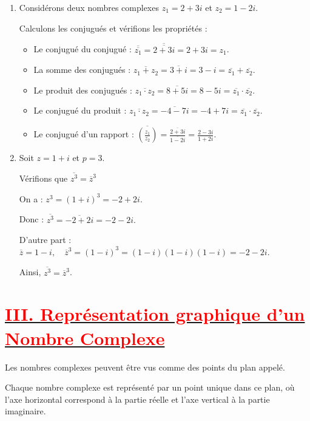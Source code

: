 \documentclass[12pt,a4paper]{article}
\begin{document}
\begin{enumerate}
\item Considérons deux nombres complexes $z_1 = 2 + 3i$ et $z_2 = 1 - 2i$. 

Calculons les conjugués et vérifions les propriétés :

\begin{itemize}
\item[$\bullet$] Le conjugué du conjugué : $\overline{\overline{z_1}} = \overline{\overline{2 + 3i}} = 2 + 3i = z_1$.
\item[$\bullet$] La somme des conjugués : $\overline{z_1 + z_2} = \overline{3 + i} = 3 - i = \overline{z_1} + \overline{z_2}$.
\item[$\bullet$] Le produit des conjugués : $\overline{z_1 \cdot z_2} = \overline{8 + 5i} = 8 - 5i = \overline{z_1} \cdot \overline{z_2}$.
\item[$\bullet$] Le conjugué du produit : $\overline{z_1 \cdot z_2} = \overline{-4 - 7i} = -4 + 7i = \overline{z_1} \cdot \overline{z_2}$.
\item[$\bullet$] Le conjugué d'un rapport : $\overline{(\frac{z_1}{z_2})} = \frac{\overline{2 + 3i}}{\overline{1 - 2i}} = \frac{2 - 3i}{1 + 2i}$.

\end{itemize}
\item Soit \(z = 1 + i\) et \(p = 3\). 

Vérifions que  \(\overline{z^3} = \overline{z}^3 \)

On a :
\(
z^3 = (1 + i)^3 = -2 + 2i.
\)

Donc :
\(
\overline{z^3} = \overline{-2 + 2i} = -2 - 2i.
\)

D'autre part :
\(
\overline{z} = 1 - i, \quad \overline{z}^3 = (1 - i)^3 = (1 - i)(1 - i)(1 - i) = -2 - 2i.
\)

Ainsi, \(\overline{z^3} = \overline{z}^3\).
\end{enumerate}

\section*{\underline{\textbf{\textcolor{red}{III. Représentation graphique d'un Nombre Complexe }}}}

Les nombres complexes peuvent être vus comme des points du plan appelé.

Chaque nombre complexe est représenté par un point unique dans ce plan, où l'axe horizontal correspond à la partie réelle et l'axe vertical à la partie imaginaire.
\end{document}
